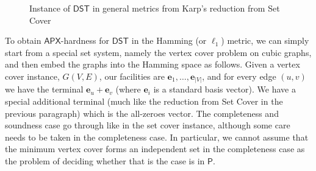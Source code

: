 \documentclass{theoretics}
\newcommand{\1}{\textbf{1}}
\newcommand{\dst}{$\mathsf{DST}$\xspace}
\newcommand{\apx}{$\mathsf{APX}$\xspace}
\begin{document}
\begin{figure}[h]






    \caption{Instance of \dst in general metrics from Karp's reduction from Set Cover}
    \label{fig: karp reduction}
\end{figure}

To obtain \apx-hardness for \dst in the Hamming (or $\ell_1$) metric, we can simply start from a special set system, namely the vertex cover problem on cubic graphs, and then embed the graphs into the Hamming space as follows. Given a vertex cover instance, $G(V,E)$, our facilities are $\mathbf{e}_1,\ldots, \mathbf{e}_{|V|}$, and for every edge $(u,v)$ we have the terminal $\mathbf{e}_u+\mathbf{e}_v$ (where $\mathbf{e}_i$ is a standard basis vector). We have a special additional terminal (much like the reduction from Set Cover in the previous paragraph) which is the all-zeroes vector. The completeness and soundness case go through like in the set cover instance, although some care needs to be taken in the completeness case. In particular, we cannot assume that the minimum vertex cover forms an independent set in the completeness case as the problem of deciding whether that is the case is in $\textsf{P}$.
\end{document}
